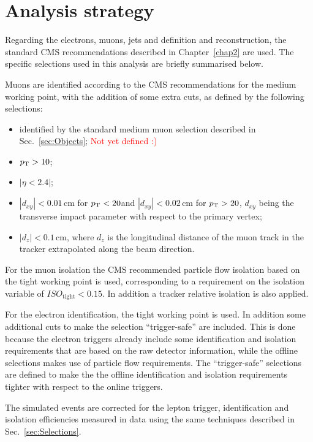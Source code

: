 \section{Analysis strategy}\label{chap5:analysis_strategy}

Regarding the electrons, muons, jets and \MET definition and reconstruction, the standard CMS recommendations described in Chapter~\ref{chap2} are used. The specific selections used in this analysis are briefly summarised below.

Muons are identified according to the CMS recommendations for the medium working point, with the addition of some extra cuts, as defined by the following selections:
\begin{itemize}
\item identified by the standard medium muon selection described in Sec.~\ref{sec:Objects}; \textcolor{red}{Not yet defined :)}
\item $p_\mathrm{T}> 10$\GeV;
\item $|\eta < 2.4|$;
\item $|d_{xy}| < 0.01$\,cm for $p_\mathrm{T} < 20$\GeV and $|d_{xy}| < 0.02$\,cm for $p_\mathrm{T} > 20$\GeV, $d_{xy}$ being the transverse impact parameter with respect to the primary vertex;
\item $|d_{z}| < 0.1$\,cm, where $d_z$ is the longitudinal distance of the muon track in the tracker extrapolated along the beam direction.
\end{itemize}

For the muon isolation the CMS recommended particle flow isolation based on the tight working point is used, corresponding to a requirement on the isolation variable of $ISO_\mathrm{tight} < 0.15$. In addition a tracker relative isolation is also applied.

For the electron identification, the tight working point is used. In addition some additional cuts to make the selection ``trigger-safe'' are included. This is done because the electron triggers already include some identification and isolation requirements that are based on the raw detector information, while the offline selections makes use of particle flow requirements. The ``trigger-safe'' selections are defined to make the the offline identification and isolation requirements tighter with respect to the online triggers.

The simulated events are corrected for the lepton trigger, identification and isolation efficiencies measured in data using the same techniques described in Sec.~\ref{sec:Selections}.
